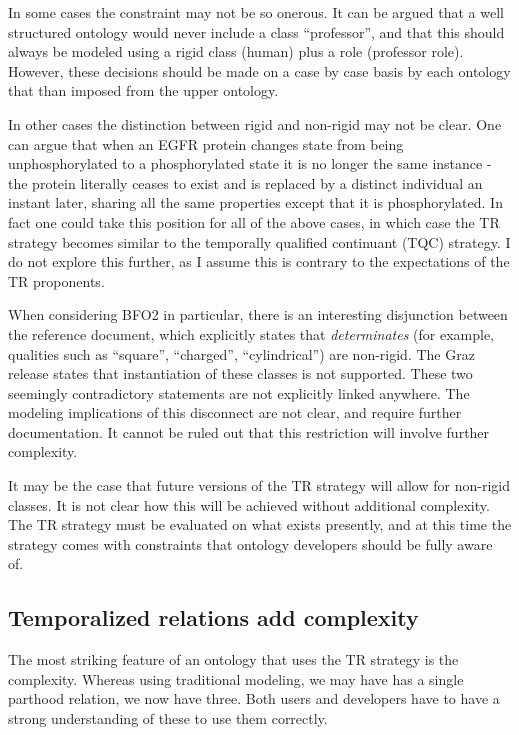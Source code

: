 \documentclass{bioinfo}
\begin{document}
In some cases the constraint may not be so onerous. It can be argued
that a well structured ontology would never include a class
``professor'', and that this should always be modeled using a rigid
class (human) plus a role (professor role). However, these decisions
should be made on a case by case basis by each ontology that than
imposed from the upper ontology.

In other cases the distinction between rigid and non-rigid may not be
clear. One can argue that when an EGFR protein changes state from
being unphosphorylated to a phosphorylated state it is no longer the
same instance - the protein literally ceases to exist and is replaced
by a distinct individual an instant later, sharing all the same
properties except that it is phosphorylated. In fact one could take
this position for all of the above cases, in which case the TR
strategy becomes similar to the temporally qualified continuant (TQC)
strategy. I do not explore this further, as I assume this is contrary
to the expectations of the TR proponents.

When considering BFO2 in particular, there is an interesting
disjunction between the reference document, which explicitly states
that \emph{determinates} (for example, qualities such as ``square'',
``charged'', ``cylindrical'') are non-rigid. The Graz release states
that instantiation of these classes is not supported. These two
seemingly contradictory statements are not explicitly linked
anywhere. The modeling implications of this disconnect are not clear,
and require further documentation. It cannot be ruled out that this
restriction will involve further complexity.

It may be the case that future versions of the TR strategy will allow
for non-rigid classes. It is not clear how this will be achieved
without additional complexity.  The TR strategy must be evaluated on
what exists presently, and at this time the strategy comes with
constraints that ontology developers should be fully aware of.

\subsection{Temporalized relations add complexity}

The most striking feature of an ontology that uses the TR strategy is
the complexity. Whereas using traditional modeling, we may have has a
single parthood relation, we now have three. Both users and developers
have to have a strong understanding of these to use them correctly.
\end{document}
